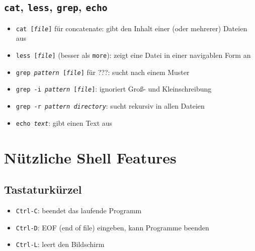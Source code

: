 \subsection{\texttt{cat}, \texttt{less}, \texttt{grep}, \texttt{echo}}
\begin{itemize}
  \item \texttt{cat [\textit{file}]} für concatenate: gibt den Inhalt einer (oder mehrerer) Dateien aus
  \item \texttt{less [\textit{file}]} (besser als \texttt{more}): zeigt eine Datei in einer navigablen Form an
  \item \texttt{grep \textit{pattern} [\textit{file}]} für ???: sucht nach einem Muster
  \item \texttt{grep -i \textit{pattern} [\textit{file}]}: ignoriert Groß- und Kleinschreibung
  \item \texttt{grep -r \textit{pattern} \textit{directory}}: sucht rekursiv in allen Dateien
  \item \texttt{echo \textit{text}}: gibt einen Text aus
\end{itemize}

\section{Nützliche Shell Features}
\subsection{Tastaturkürzel}
\begin{itemize}
  \item \texttt{Ctrl-C}: beendet das laufende Programm
  \item \texttt{Ctrl-D}: EOF (end of file) eingeben, kann Programme beenden
  \item \texttt{Ctrl-L}: leert den Bildschirm
\end{itemize}

